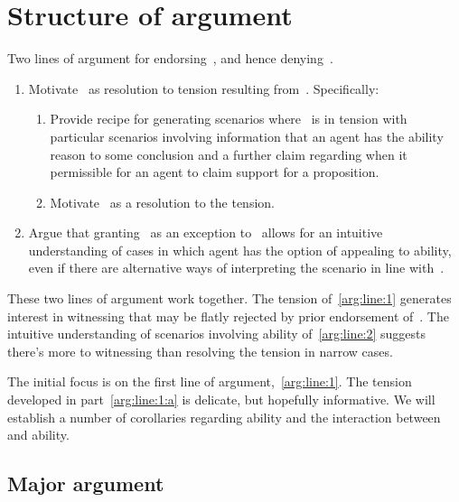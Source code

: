 \section{Structure of argument}
\label{sec:structure-argument}

\begin{note}
  Two lines of argument for endorsing~\EAS{}, and hence denying~\ESU{}.
  \begin{enumerate}[label=(L\arabic*), ref=(L\arabic*)]
  \item\label{arg:line:1} Motivate~\EAS{} as resolution to tension resulting from~\ESU{}.\newline
    Specifically:
    \begin{enumerate}[label=(L1\alph*)]
    \item\label{arg:line:1:a} Provide recipe for generating scenarios where~\ESU{} is in tension with particular scenarios involving information that an agent has the ability reason to some conclusion and a further claim regarding when it permissible for an agent to claim support for a proposition.
    \item\label{arg:line:1:b} Motivate~\EAS{} as a resolution to the tension.
    \end{enumerate}
  \item\label{arg:line:2} Argue that granting~\EAS{} as an exception to~\ESU{} allows for an intuitive understanding of cases in which agent has the option of appealing to ability, even if there are alternative ways of interpreting the scenario in line with~\ESU{}.
  \end{enumerate}
  These two lines of argument work together.
  The tension of~\ref{arg:line:1} generates interest in witnessing that may be flatly rejected by prior endorsement of~\ESU{}.
  The intuitive understanding of scenarios involving ability of~\ref{arg:line:2} suggests there's more to witnessing than resolving the tension in narrow cases.
\end{note}

\begin{note}
  The initial focus is on the first line of argument,~\ref{arg:line:1}.
  The tension developed in part~\ref{arg:line:1:a} is delicate, but hopefully informative.
  We will establish a number of corollaries regarding ability and the interaction between~\ESU{} and ability.
\end{note}

\subsection{Major argument}
\label{sec:major-argument}

